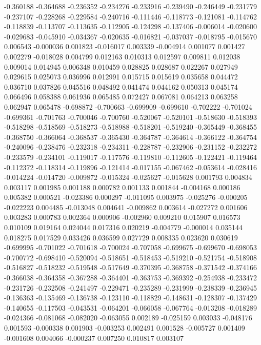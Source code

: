 -0.360188
-0.364688
-0.236352
-0.234276
-0.233916
-0.239490
-0.246449
-0.231779
-0.237107
-0.228268
-0.229584
-0.240716
-0.111446
-0.118773
-0.121081
-0.114762
-0.118839
-0.113707
-0.113635
-0.112905
-0.124298
-0.137406
-0.006014
-0.020600
-0.029683
-0.045910
-0.034367
-0.020635
-0.016821
-0.037037
-0.018795
-0.015670
0.006543
-0.000036
0.001823
-0.016017
0.003339
-0.004914
0.001077
0.001427
0.002279
-0.018028
0.004799
0.012163
0.010313
0.012597
0.009811
0.012038
0.009014
0.014945
0.006348
0.010459
0.028825
0.028687
0.022267
0.027949
0.029615
0.025073
0.036996
0.012991
0.015715
0.015619
0.035658
0.044472
0.036710
0.037826
0.045516
0.048492
0.041474
0.044162
0.050313
0.045174
0.066496
0.058388
0.061936
0.065485
0.072427
0.067081
0.064213
0.063258
0.062947
0.065478
-0.698872
-0.700663
-0.699909
-0.699610
-0.702222
-0.701024
-0.699361
-0.701763
-0.700046
-0.700760
-0.520067
-0.520101
-0.518630
-0.518393
-0.518298
-0.518569
-0.518273
-0.518988
-0.518201
-0.519240
-0.365449
-0.368455
-0.368750
-0.366064
-0.368537
-0.365430
-0.364787
-0.364614
-0.366122
-0.364754
-0.240096
-0.238476
-0.232318
-0.234311
-0.228787
-0.232906
-0.231152
-0.232272
-0.233579
-0.234101
-0.119017
-0.117576
-0.119810
-0.112605
-0.122421
-0.119464
-0.112372
-0.118314
-0.119896
-0.121414
-0.017155
-0.067462
-0.053614
-0.028416
-0.014224
-0.014720
-0.009872
-0.015324
-0.025627
-0.015628
0.001793
0.004834
0.003117
0.001985
0.001188
0.000782
0.001133
0.001844
-0.004168
0.000186
0.005382
0.000521
-0.023386
0.000297
-0.011095
0.003975
-0.025276
-0.000205
-0.022223
0.004485
-0.013048
0.004641
-0.009862
0.003614
-0.027272
0.001606
0.003283
0.000783
0.002364
0.000906
-0.002960
0.009210
0.015907
0.016573
0.010109
0.019164
0.024044
0.017316
0.020219
-0.004779
-0.000014
0.035144
0.018275
0.017529
0.033426
0.036599
0.027729
0.008335
0.023620
0.030619
-0.699995
-0.701022
-0.701618
-0.700024
-0.707058
-0.699675
-0.699670
-0.698053
-0.700772
-0.698410
-0.520094
-0.518651
-0.518453
-0.519210
-0.521754
-0.518908
-0.516827
-0.518232
-0.519548
-0.517649
-0.370395
-0.368758
-0.371542
-0.374166
-0.366038
-0.364358
-0.367288
-0.364401
-0.363753
-0.369392
-0.254938
-0.233472
-0.231726
-0.232508
-0.241497
-0.229471
-0.235289
-0.231999
-0.238339
-0.236945
-0.136363
-0.135469
-0.136738
-0.123110
-0.118829
-0.148631
-0.128307
-0.137429
-0.140655
-0.117503
-0.043531
-0.064201
-0.066058
-0.067764
-0.013208
-0.018289
-0.024366
-0.081068
-0.082020
-0.063055
0.002189
-0.025159
0.003033
-0.048176
0.001593
-0.000338
0.001903
-0.003253
0.002491
0.001528
-0.005727
0.001409
-0.001608
0.004066
-0.000237
0.007250
0.010817
0.003107
